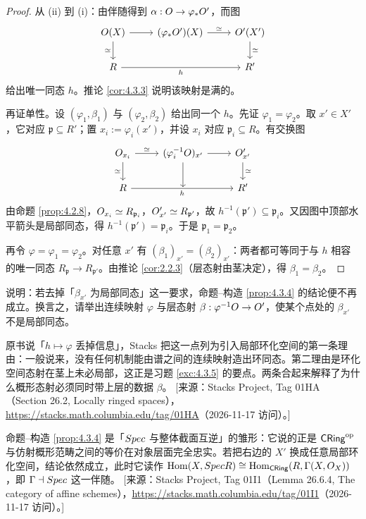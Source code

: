 \begin{proof}
从 (ii) 到 (i)：由伴随得到 $\alpha : O \to \varphi_*O'$，而图
\[
\begin{tikzcd}
\cO(X) \arrow[r] \arrow[d,"\simeq"'] & (\varphi_*\cO')(X) \arrow[r,"\simeq"] & \cO'(X') \arrow[d,"\simeq"] \\
R \arrow[rr,"h"'] & {} & R'
\end{tikzcd}
\]
给出唯一同态 $h$。推论 \ref{cor:4.3.3} 说明该映射是满的。

再证单性。设 $(\varphi_1,\beta_1)$ 与 $(\varphi_2,\beta_2)$ 给出同一个 $h$。先证 $\varphi_1 = \varphi_2$。取 $x' \in X'$，它对应 $\mathfrak p \subseteq R'$；置 $x_i := \varphi_i(x')$，并设 $x_i$ 对应 $\mathfrak p_i \subseteq R$。有交换图
\[
\begin{tikzcd}
\cO_{x_i} \arrow[r,"\simeq"] \arrow[d,"\simeq"'] & (\varphi_i^{-1}\cO)_{x'} \arrow[r] \arrow[d] & \cO'_{x'} \arrow[d,"\simeq"] \\
R \arrow[rr,"h"'] & {} & R'
\end{tikzcd}
\]
由命题 \ref{prop:4.2.8}，$O_{x_i} \simeq R_{\mathfrak p_i}$，$O'_{x'} \simeq R_{\mathfrak p'}$，故 $h^{-1}(\mathfrak p') \subseteq \mathfrak p_i$。又因图中顶部水平箭头是局部同态，得 $h^{-1}(\mathfrak p') = \mathfrak p_i$。于是 $\mathfrak p_1 = \mathfrak p_2$。

再令 $\varphi = \varphi_1 = \varphi_2$。对任意 $x'$ 有 $(\beta_1)_{x'} = (\beta_2)_{x'}$：两者都可等同于与 $h$ 相容的唯一同态 $R_{\mathfrak p} \to R_{\mathfrak p'}$。由推论 \ref{cor:2.2.3}（层态射由茎决定），得 $\beta_1 = \beta_2$。
\end{proof}

\begin{exercise}\label{exc:4.3.5}
说明：若去掉「$\beta_{x'}$ 为局部同态」这一要求，命题--构造 \ref{prop:4.3.4} 的结论便不再成立。换言之，请举出连续映射 $\varphi$ 与层态射 $\beta : \varphi^{-1}O \to O'$，使某个点处的 $\beta_{x'}$ 不是局部同态。
\end{exercise}

\begin{yizhu}
原书说「$h\mapsto\varphi$ 丢掉信息」，Stacks 把这一点列为引入局部环化空间的第一条理由：一般说来，没有任何机制能由谱之间的连续映射造出环同态。第二理由是环化空间态射在茎上未必局部，这正是习题 \ref{exc:4.3.5} 的要点。两条合起来解释了为什么概形态射必须同时带上层的数据 $\beta$。
[来源：Stacks Project, Tag 01HA（Section 26.2, Locally ringed spaces），\url{https://stacks.math.columbia.edu/tag/01HA}（2026-11-17 访问）。]
\end{yizhu}

\begin{yizhu}
命题--构造 \ref{prop:4.3.4} 是「$Spec$ 与整体截面互逆」的雏形：它说的正是 $\mathsf{CRing}^{\mathrm{op}}$ 与仿射概形范畴之间的等价在对象层面完全忠实。若把右边的 $X'$ 换成任意局部环化空间，结论依然成立，此时它读作 $\operatorname{Hom}(X,Spec R)\cong\operatorname{Hom}_{\mathsf{CRing}}(R,\Gamma(X,O_X))$，即 $\Gamma\dashv Spec$ 这一伴随。
[来源：Stacks Project, Tag 01I1（Lemma 26.6.4, The category of affine schemes），\url{https://stacks.math.columbia.edu/tag/01I1}（2026-11-17 访问）。]
\end{yizhu}
